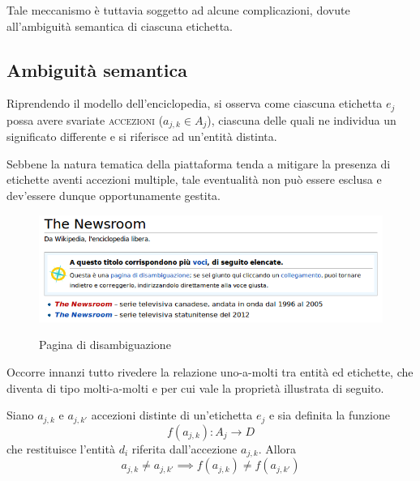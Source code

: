 Tale meccanismo è tuttavia soggetto ad alcune complicazioni, dovute all'ambiguità semantica di ciascuna etichetta.

\subsection{Ambiguità semantica}
\label{sec:tesi:stage:criterio-classificazione:ambiguità-semantica}
Riprendendo il modello dell'enciclopedia, si osserva come ciascuna etichetta $e_j$ possa avere svariate \textsc{accezioni} ($a_{j,k} \in A_j$), ciascuna delle quali ne individua un significato differente e si riferisce ad un'entità distinta.

Sebbene la natura tematica della piattaforma tenda a mitigare la presenza di etichette aventi accezioni multiple, tale eventualità non può essere esclusa e dev'essere dunque opportunamente gestita.

\begin{figure}[ht]
	\begin{center}
		\includegraphics[width=12cm]{disambigua.png}
		\label{fig:tesi:stage:classificazione:disambiguazione}
		\caption{Pagina di disambiguazione \cite{wiki:disambigua}}
	\end{center}
\end{figure}

Occorre innanzi tutto rivedere la relazione uno-a-molti tra entità ed etichette, che diventa di tipo molti-a-molti e per cui vale la proprietà illustrata di seguito.

Siano $a_{j,k}$ e $a_{j,k'}$ accezioni distinte di un'etichetta $e_j$ e sia definita la funzione
\begin{equation}
f(a_{j,k}): A_j \rightarrow D
\end{equation}
che restituisce l'entità $d_i$ riferita dall'accezione $a_{j,k}$. Allora
\begin{equation}
a_{j,k} \neq a_{j,k'} \implies f(a_{j,k}) \neq f(a_{j,k'})
\end{equation}

